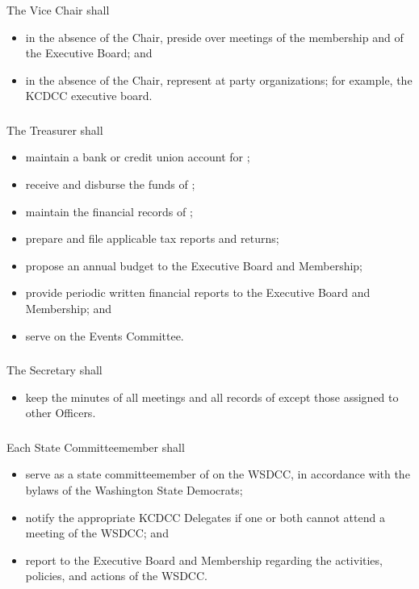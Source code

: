 \subsubsection{}
The Vice Chair shall
\begin{itemize}
    \item in the absence of the Chair, preside over meetings of the membership and of the Executive Board; and
    \item in the absence of the Chair, represent \thedistrict{} at party organizations; for example, the KCDCC executive board.
\end{itemize}

\subsubsection{}
The Treasurer shall
\begin{itemize}
    \item maintain a bank or credit union account for \thedistrict{};
    \item receive and disburse the funds of \thedistrict{};
    \item maintain the financial records of \thedistrict{};
    \item prepare and file applicable tax reports and returns;
    \item propose an annual budget to the Executive Board and Membership;
    \item provide periodic written financial reports to the Executive Board and Membership; and
    \item serve on the Events Committee.
\end{itemize}

\subsubsection{}
The Secretary shall
\begin{itemize}
    \item keep the minutes of all meetings and all records of \thedistrict{} except those assigned to other Officers.
\end{itemize}

\subsubsection{}
Each State Committeemember shall
\begin{itemize}
    \item serve as a state committeemember of \thedistrict{} on the WSDCC, in accordance with the bylaws of the Washington State Democrats;
    \item notify the appropriate KCDCC Delegates if one or both cannot attend a meeting of the WSDCC; and
    \item report to the Executive Board and Membership regarding the activities, policies, and actions of the WSDCC.
\end{itemize}


